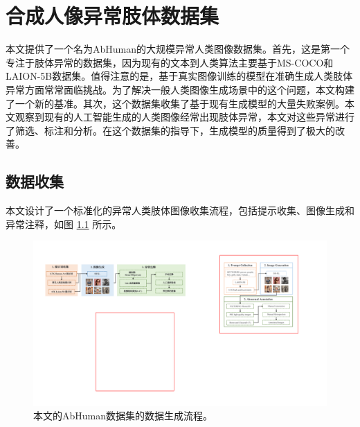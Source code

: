 \chapter{合成人像异常肢体数据集}

\label{cha:sysu-thesis-contents-format-requirement}


本文提供了一个名为AbHuman的大规模异常人类图像数据集。首先，这是第一个专注于肢体异常的数据集，因为现有的文本到人类算法主要基于MS-COCO\cite{MSCOCO_lin2014microsoft}和LAION-5B\cite{schuhmann2022laion}数据集。值得注意的是，基于真实图像训练的模型在准确生成人类肢体异常方面常常面临挑战。为了解决一般人类图像生成场景中的这个问题，本文构建了一个新的基准。其次，这个数据集收集了基于现有生成模型的大量失败案例。本文观察到现有的人工智能生成的人类图像经常出现肢体异常，本文对这些异常进行了筛选、标注和分析。在这个数据集的指导下，生成模型的质量得到了极大的改善。



\section{数据收集}
本文设计了一个标准化的异常人类肢体图像收集流程，包括提示收集、图像生成和异常注释，如图 \ref{fig_datasetpipeline} 所示。

\begin{figure}[h!]
    \centering
    \includegraphics[width=1\columnwidth]{fig/dataset_pipeline.pdf}
    \caption{本文的AbHuman数据集的数据生成流程。}
    \label{fig_datasetpipeline}
\end{figure}

